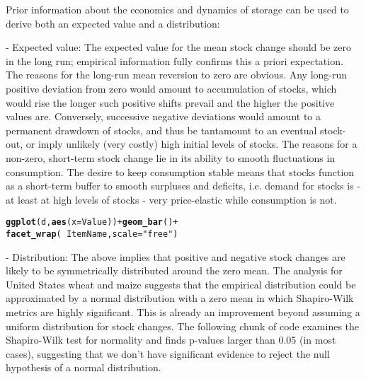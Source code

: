 \documentclass[nojss]{jss}\usepackage[]{graphicx}\usepackage[]{color}
\makeatletter
\newcommand{\hlstr}[1]{\textcolor[rgb]{0.192,0.494,0.8}{#1}}%
\newcommand{\hlopt}[1]{\textcolor[rgb]{0,0,0}{#1}}%
\newcommand{\hlstd}[1]{\textcolor[rgb]{0.345,0.345,0.345}{#1}}%
\newcommand{\hlkwc}[1]{\textcolor[rgb]{0.333,0.667,0.333}{#1}}%
\newcommand{\hlkwd}[1]{\textcolor[rgb]{0.737,0.353,0.396}{\textbf{#1}}}%
\newenvironment{kframe}{%
 \def\at@end@of@kframe{}%
 \ifinner\ifhmode%
  \def\at@end@of@kframe{\end{minipage}}%
  \begin{minipage}{\columnwidth}%
 \fi\fi%
 \def\FrameCommand##1{\hskip\@totalleftmargin \hskip-\fboxsep
 \colorbox{shadecolor}{##1}\hskip-\fboxsep
     \hskip-\linewidth \hskip-\@totalleftmargin \hskip\columnwidth}%
 \MakeFramed {\advance\hsize-\width
   \@totalleftmargin\z@ \linewidth\hsize
   \@setminipage}}%
 {\par\unskip\endMakeFramed%
 \at@end@of@kframe}
\newenvironment{knitrout}{}{} %
\makeatother
\begin{document}
Prior information about the economics and dynamics of storage can be used to derive both an expected value and a distribution:

- Expected value: The expected value for the mean stock change should be zero in the long run; empirical information fully confirms this a priori expectation. The reasons for the long-run mean reversion to zero are obvious. Any long-run positive deviation from zero would amount to accumulation of stocks, which would rise the longer such positive shifts prevail and the higher the positive values are. Conversely, successive negative deviations would amount to a permanent drawdown of stocks, and thus be tantamount to an eventual stock-out, or imply unlikely (very costly) high initial levels of stocks. The reasons for a non-zero, short-term stock change lie in its ability to smooth fluctuations in consumption. The desire to keep consumption stable means that stocks function as a short-term buffer to smooth surpluses and deficits, i.e. demand for stocks is - at least at high levels of stocks - very price-elastic while consumption is not.

\begin{knitrout}
\color{fgcolor}\begin{kframe}
\begin{alltt}
\hlkwd{ggplot}\hlstd{(d,} \hlkwd{aes}\hlstd{(}\hlkwc{x} \hlstd{= Value))} \hlopt{+} \hlkwd{geom_bar}\hlstd{()} \hlopt{+}
    \hlkwd{facet_wrap}\hlstd{(} \hlopt{~} \hlstd{ItemName,} \hlkwc{scale} \hlstd{=} \hlstr{"free"}\hlstd{)}
\end{alltt}


{\ttfamily\noindent\bfseries\color{errorcolor}{\#\# Error in ggplot(d, aes(x = Value)): object 'd' not found}}\end{kframe}
\end{knitrout}

- Distribution: The above implies that positive and negative stock changes are likely to be symmetrically distributed around the zero mean. The analysis for United States wheat and maize suggests that the empirical distribution could be approximated by a normal distribution with a zero mean in which Shapiro-Wilk metrics are highly significant. This is already an improvement beyond assuming a uniform distribution for stock changes.  The following chunk of code examines the Shapiro-Wilk test for normality and finds p-values larger than 0.05 (in most cases), suggesting that we don't have significant evidence to reject the null hypothesis of a normal distribution.
\end{document}
